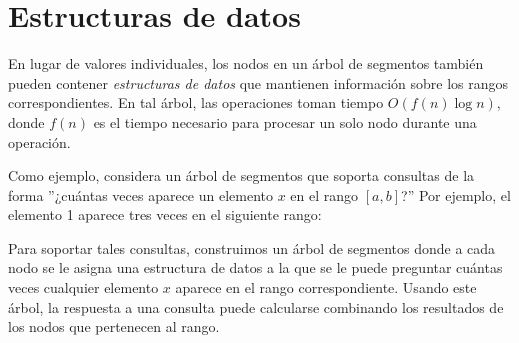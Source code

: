 \section{Estructuras de datos}

En lugar de valores individuales, los nodos en un árbol de segmentos
también pueden contener \emph{estructuras de datos} que mantienen información
sobre los rangos correspondientes.
En tal árbol, las operaciones toman
tiempo $O(f(n) \log n)$, donde $f(n)$ es
el tiempo necesario para procesar un solo nodo durante una operación.

Como ejemplo, considera un árbol de segmentos que
soporta consultas de la forma
''¿cuántas veces aparece un elemento $x$
en el rango $[a,b]$?''
Por ejemplo, el elemento 1 aparece tres veces
en el siguiente rango:

\begin{center}
\end{center}

Para soportar tales consultas, construimos un árbol de segmentos
donde a cada nodo se le asigna una estructura de datos
a la que se le puede preguntar cuántas veces cualquier elemento $x$
aparece en el rango correspondiente.
Usando este árbol,
la respuesta a una consulta puede calcularse
combinando los resultados de los nodos
que pertenecen al rango.

